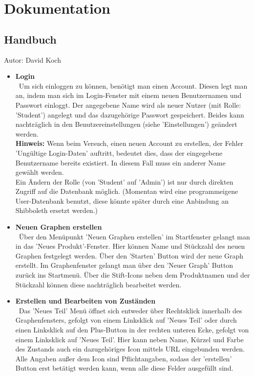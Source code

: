 \documentclass[twoside]{report}
\begin{document}


\section{Dokumentation}

\subsection{Handbuch}
{\small Autor: David Koch}
\begin{itemize}
  \item \textbf{ Login }
    \\\
      Um sich einloggen zu können, benötigt man einen Account. Diesen legt man an, indem man sich im Login-Fenster mit einem neuen Benutzernamen und Passwort einloggt. Der angegebene Name wird als neuer Nutzer (mit Rolle: 'Student') angelegt und das dazugehörige Passwort gespeichert. Beides kann nachträglich in den Benutzereinstellungen (siehe 'Einstellungen') geändert werden.
      \\\textbf{Hinweis:} Wenn beim Versuch, einen neuen Account zu erstellen, der Fehler 'Ungültige Login-Daten' auftritt, bedeutet dies, dass der eingegebene Benutzername bereits existiert. In diesem Fall muss ein anderer Name gewählt werden.\\
      Ein Ändern der Rolle (von 'Student' auf 'Admin') ist nur durch direkten Zugriff auf die Datenbank möglich. (Momentan wird eine programmeigene User-Datenbank benutzt, diese könnte später durch eine Anbindung an Shibboleth ersetzt werden.)
  \item \textbf{ Neuen Graphen erstellen }
    \\\
      Über den Menüpunkt 'Neuen Graphen erstellen' im Startfenster gelangt man in das 'Neues Produkt'-Fenster. Hier können Name und Stückzahl des neuen Graphen festgelegt werden. Über den 'Starten'  Button wird der neue Graph erstellt. Im Graphenfenster gelangt man über den 'Neuer Graph' Button zurück ins Startmenü. Über die Stift-Icons neben dem Produktnamen und der Stückzahl können diese nachträglich bearbeitet werden.
  \item \textbf{ Erstellen und Bearbeiten von Zuständen }
    \\\
      Das 'Neues Teil' Menü öffnet sich entweder über Rechtsklick innerhalb des Graphenfensters, gefolgt von einem Linksklick auf 'Neues Teil' oder durch einen Linksklick auf den Plus-Button in der rechten unteren Ecke, gefolgt von einem Linksklick auf 'Neues Teil'. Hier kann neben Name, Kürzel und Farbe des Zustands auch ein dazugehöriges Icon mittels URL eingebunden werden. Alle Angaben außer dem Icon sind Pflichtangaben, sodass der 'erstellen' Button erst betätigt werden kann, wenn alle diese Felder ausgefüllt sind.\\

\end{itemize}
\end{document}
